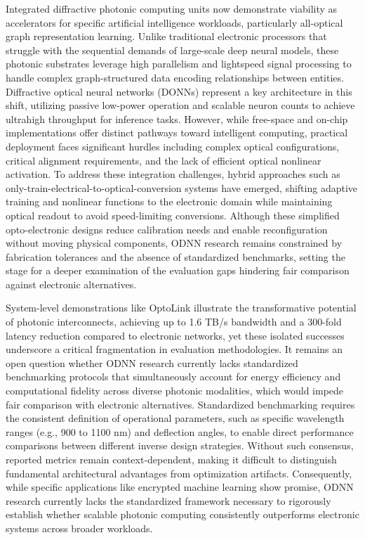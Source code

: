 \documentclass[11pt]{article}
\begin{document}
Integrated diffractive photonic computing units now demonstrate viability as accelerators for specific artificial intelligence workloads, particularly all-optical graph representation learning. Unlike traditional electronic processors that struggle with the sequential demands of large-scale deep neural models, these photonic substrates leverage high parallelism and lightspeed signal processing to handle complex graph-structured data encoding relationships between entities. Diffractive optical neural networks (DONNs) represent a key architecture in this shift, utilizing passive low-power operation and scalable neuron counts to achieve ultrahigh throughput for inference tasks. However, while free-space and on-chip implementations offer distinct pathways toward intelligent computing, practical deployment faces significant hurdles including complex optical configurations, critical alignment requirements, and the lack of efficient optical nonlinear activation. To address these integration challenges, hybrid approaches such as only-train-electrical-to-optical-conversion systems have emerged, shifting adaptive training and nonlinear functions to the electronic domain while maintaining optical readout to avoid speed-limiting conversions. Although these simplified opto-electronic designs reduce calibration needs and enable reconfiguration without moving physical components, ODNN research remains constrained by fabrication tolerances and the absence of standardized benchmarks, setting the stage for a deeper examination of the evaluation gaps hindering fair comparison against electronic alternatives. \citep{doi_10_1126_sciadv_abn7630_4399f2ff} \citep{doi_10_1002_nap2_70098_8d5f2f8a} \citep{doi_10_1364_oe_462370_1269b480}

System-level demonstrations like OptoLink illustrate the transformative potential of photonic interconnects, achieving up to 1.6 TB/s bandwidth and a 300-fold latency reduction compared to electronic networks, yet these isolated successes underscore a critical fragmentation in evaluation methodologies. It remains an open question whether ODNN research currently lacks standardized benchmarking protocols that simultaneously account for energy efficiency and computational fidelity across diverse photonic modalities, which would impede fair comparison with electronic alternatives. Standardized benchmarking requires the consistent definition of operational parameters, such as specific wavelength ranges (e.g., 900 to 1100 nm) and deflection angles, to enable direct performance comparisons between different inverse design strategies. Without such consensus, reported metrics remain context-dependent, making it difficult to distinguish fundamental architectural advantages from optimization artifacts. Consequently, while specific applications like encrypted machine learning show promise, ODNN research currently lacks the standardized framework necessary to rigorously establish whether scalable photonic computing consistently outperforms electronic systems across broader workloads. \citep{doi_10_1145_3806395_315ab915} \citep{doi_10_1515_nanoph_2023_0852_cb27a26f} \citep{s2_9b444e84d20ae6e3d62d2d4df30268b5a53baad2_40af2cc9}
\end{document}
